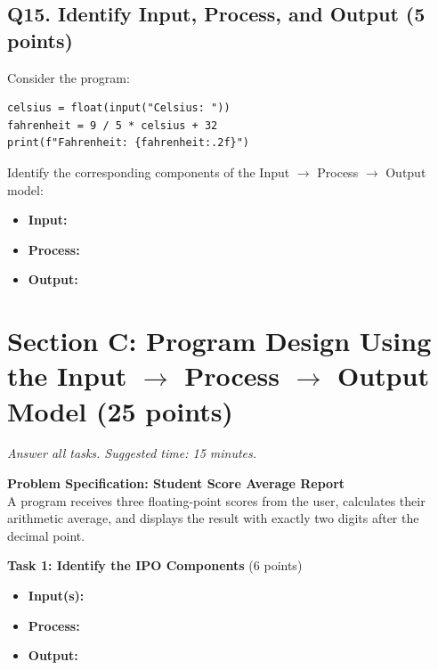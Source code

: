 \documentclass[11pt,a4paper]{article}
\begin{document}
\subsection*{Q15. Identify Input, Process, and Output (5 points)}
Consider the program:

\begin{lstlisting}
celsius = float(input("Celsius: "))
fahrenheit = 9 / 5 * celsius + 32
print(f"Fahrenheit: {fahrenheit:.2f}")
\end{lstlisting}

Identify the corresponding components of the Input $\rightarrow$ Process $\rightarrow$ Output model:
\begin{itemize}[leftmargin=2em]
  \item \textbf{Input:} \hrulefill
  \item \textbf{Process:} \hrulefill
  \item \textbf{Output:} \hrulefill
\end{itemize}

\newpage


\section*{Section C: Program Design Using the Input $\rightarrow$ Process $\rightarrow$ Output Model \hfill \normalsize\normalfont(25 points)}
\textit{Answer all tasks. Suggested time: 15 minutes.}

\begin{tcolorbox}[colback=boxbg,colframe=secondaryteal,arc=1.5mm,boxrule=0.6pt]
\textbf{Problem Specification: Student Score Average Report}\\[1mm]
A program receives three floating-point scores from the user, calculates their arithmetic average, and displays the result with exactly two digits after the decimal point.
\end{tcolorbox}

\vspace{1mm}
\textbf{Task 1: Identify the IPO Components} (6 points)
\begin{itemize}[leftmargin=2em]
  \item \textbf{Input(s):} \hrulefill\\[4mm]
  \item \textbf{Process:} \hrulefill\\[4mm]
  \item \textbf{Output:} \hrulefill
\end{itemize}
\end{document}
